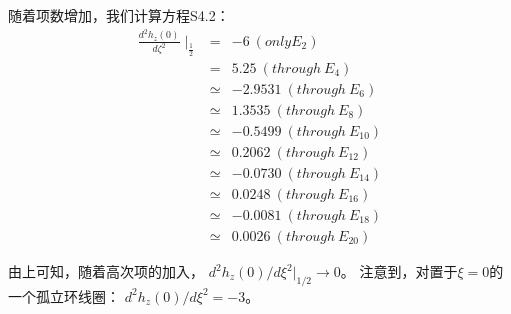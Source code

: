 随着项数增加，我们计算方程S4.2：
\begin{eqnarray}
\frac{d^2h_z(0)}{d\zeta^2}\mid_{\frac{1}{2}}&=&-6\ (only E_2)\\
&=&5.25  \ (through\ E_4)\\
&\simeq& -2.9531\   (through\ E_6)\\
&\simeq& 1.3535\ (through\ E_8)\\
&\simeq& -0.5499\   (through\ E_{10})\\
&\simeq& 0.2062 \  (through\ E_{12})\\
&\simeq& -0.0730\   (through\ E_{14})\\
&\simeq& 0.0248 \  (through\ E_{16})\\
&\simeq&-0.0081\   (through\ E_{18})\\
&\simeq& 0.0026 \  (through\ E_{20})
\end{eqnarray}


由上可知，随着高次项的加入， $d^2h_z(0)/d\xi^2|_{1/2}\rightarrow 0$。
注意到，对置于$\xi=0$的一个孤立环线圈： $d^2h_z(0)/d\xi^2=−3$。
\newpage


